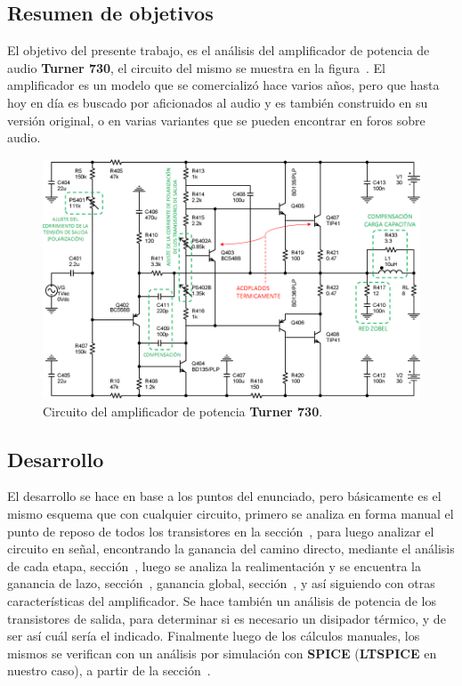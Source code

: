 
\subsection{Resumen de objetivos}

El objetivo del presente trabajo, es el análisis del amplificador de potencia de audio \textbf{Turner 730}, el circuito del mismo se muestra en la figura~. El amplificador es un modelo que se comercializó hace varios años, pero que hasta hoy en día es buscado por aficionados al audio y es también construido en su versión original, o en varias variantes que se pueden encontrar en foros sobre audio.


\begin{figure}[H] %
\begin{center}
\includegraphics[width=0.9 \textwidth, angle=0]{./img/desarrollo/0_circuito_propuesto.png}
\caption{\label{fig:fig_complete_real_circuit}\footnotesize{Circuito del amplificador de potencia \textbf{Turner 730}.}}
\end{center}
\end{figure}




\subsection{Desarrollo}


El desarrollo se hace en base a los puntos del enunciado, pero básicamente es el mismo esquema que con cualquier circuito, primero se analiza en forma manual el punto de reposo de todos los transistores en la sección~, para luego analizar el circuito en señal, encontrando la ganancia del camino directo, mediante el análisis de cada etapa, sección~, luego se analiza la realimentación y se encuentra la ganancia de lazo, sección~, ganancia global, sección~, y así siguiendo con otras características del amplificador. Se hace también un análisis de potencia de los transistores de salida, para determinar si es necesario un disipador térmico, y de ser así cuál sería el indicado. Finalmente luego de los cálculos manuales, los mismos se verifican con un análisis por simulación con \textbf{SPICE} (\textbf{LTSPICE} en nuestro caso), a partir de la sección~.






\clearpage